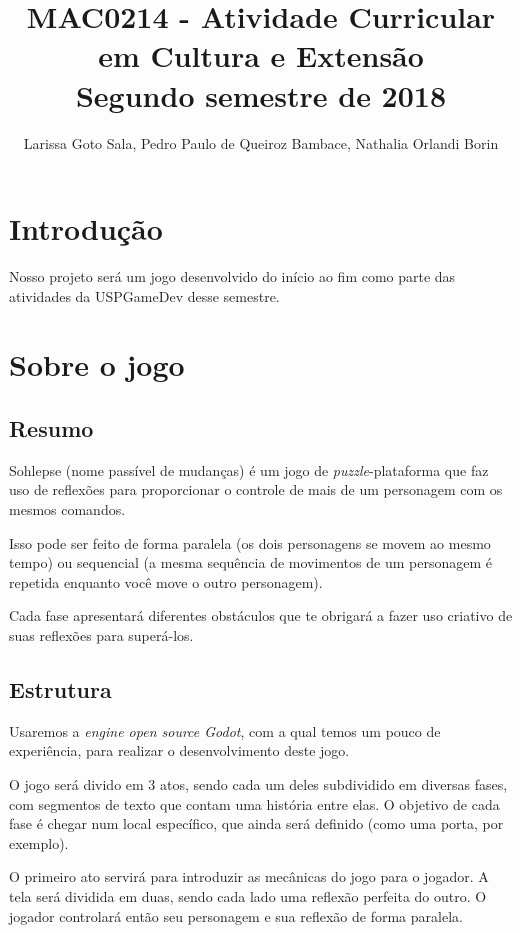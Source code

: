 \documentclass[a4paper, 11pt]{article}
\title{\textbf{MAC0214 - Atividade Curricular em Cultura e Extensão} \\ \small{Segundo semestre de 2018}}
\author{Larissa Goto Sala, Pedro Paulo de Queiroz Bambace, Nathalia Orlandi Borin}
\begin{document}
\maketitle

\newpage

\newpage

\section{Introdução}
	
	Nosso projeto será um jogo desenvolvido do início ao fim como parte das atividades da USPGameDev
	desse semestre.

\section{Sobre o jogo}
\subsection{Resumo}

	Sohlepse (nome passível de mudanças) é um jogo de \textit{puzzle}-plataforma que faz uso
 de reflexões para proporcionar o controle de mais de um personagem com os mesmos comandos.

 	Isso pode ser feito de forma paralela (os dois personagens se movem ao mesmo tempo) ou
 sequencial (a mesma sequência de movimentos de um personagem é repetida enquanto você
 move o outro personagem).

 	Cada fase apresentará diferentes obstáculos que te obrigará a fazer uso criativo de suas
 reflexões para superá-los.

\subsection{Estrutura}
	Usaremos a \textit{engine open source Godot}, com a qual temos um pouco de experiência, para realizar o desenvolvimento deste jogo.

	O jogo será divido em 3 atos, sendo cada um deles subdividido em diversas fases, com segmentos de texto que contam
uma história entre elas. O objetivo de cada fase é chegar num local específico, que ainda será definido (como uma porta,
por exemplo).

	O primeiro ato servirá para introduzir as mecânicas do jogo para o jogador. A tela será dividida em duas, sendo
cada lado uma reflexão perfeita do outro. O jogador controlará então seu personagem e sua reflexão de forma 
paralela.
\end{document}
